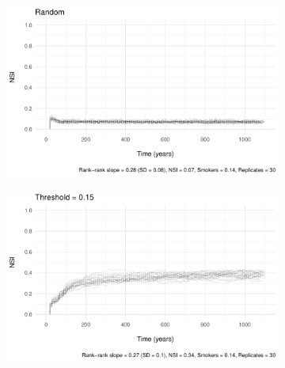 \begin{figure}[htp]
    \caption{Neighborhood sorting index (NSI) by year (30 replicates)}\vspace{5mm}
    \label{ch04:segregation_verification}
     \centering
     \begin{subfigure}[b]{0.50\textwidth}
         \centering
         \includegraphics[width=\textwidth]{plots/verification/segregation/nsi_4.pdf}
     \end{subfigure}%
     \begin{subfigure}[b]{0.50\textwidth}
         \centering
         \includegraphics[width=\textwidth]{plots/verification/segregation/nsi_1.pdf}
     \end{subfigure}\vspace{7mm}


\end{figure}
